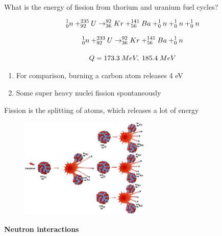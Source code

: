\documentclass[aspectratio=1610,pdftex,dvipsnames,compress,xcolor={dvipsnames}]{beamer}
\begin{document}
\addtocounter{framenumber}{-1} 
\begin{frame}{What is the energy of fission from thorium and uranium fuel cycles?}

    \begin{equation}
        \LARGE
        ^1_0n + ^{235}_{92}U \rightarrow ^{92}_{36}Kr + ^{141}_{56}Ba + ^1_0n + ^1_0n + ^1_0n  
    \end{equation}

    \begin{equation}
        \LARGE
        ^1_0n + ^{233}_{92}U \rightarrow ^{92}_{36}Kr + ^{141}_{56}Ba + ^1_0n   
    \end{equation}

    \begin{equation}
        \LARGE
        Q = 173.3 \; MeV, \; 185.4 \; MeV
    \end{equation}

    \vspace*{\fill}

    \begin{enumerate}[series=outerlist,topsep=0pt,itemsep=21pt,leftmargin=*,label=(\arabic*)]
        \item[]For comparison, burning a carbon atom releases 4 eV
        \item[]Some super heavy nuclei fission spontaneously
    \end{enumerate}
\end{frame}


\begin{frame}{Fission is the splitting of atoms, which releases a lot of energy}
    \begin{figure}
        \centering
        \includegraphics[width=0.55\textwidth]{fission.jpg}
    \end{figure}
\end{frame}


\begin{frame}[plain]{}
    \centering\LARGE\textbf{Neutron interactions}
\end{frame}
\end{document}
